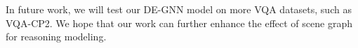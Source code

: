 \documentclass[letterpaper]{article} %
\begin{document}
In future work, we will test our DE-GNN model on more VQA datasets, such as VQA-CP2. We hope that our work can further enhance the effect of scene graph for reasoning modeling.


\newpage


\clearpage

\end{document}

